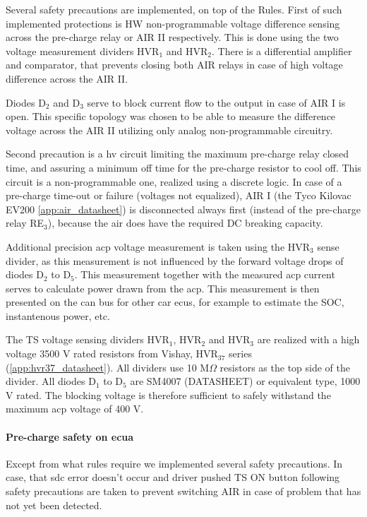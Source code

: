 Several safety precautions are implemented, on top of the Rules. First of such implemented protections is HW non-programmable voltage difference sensing across the pre-charge relay or AIR II respectively. This is done using the two voltage measurement dividers HVR$_1$ and HVR$_2$. There is a differential amplifier and comparator, that prevents closing both AIR relays in case of high voltage difference across the AIR II. 

Diodes D$_2$ and D$_3$ serve to block current flow to the output in case of AIR I is open. This specific topology was chosen to be able to measure the difference voltage across the AIR II utilizing only analog non-programmable circuitry.

Second precaution is a \gls{hv} circuit limiting the maximum pre-charge relay closed time, and assuring a minimum off time for the pre-charge resistor to cool off. This circuit is a non-programmable one, realized using a discrete logic. In case of a pre-charge time-out or failure (voltages not equalized), AIR I (the Tyco Kilovac EV200 \ref{app:air_datasheet}) is disconnected always first (instead of the pre-charge relay RE$_3$), because the \gls{air} does have the required DC breaking capacity.

Additional precision \gls{acp} voltage measurement is taken using the HVR$_3$ sense divider, as this measurement is not influenced by the forward voltage drops of diodes D$_2$ to D$_5$. This measurement together with the measured \gls{acp} current serves to calculate power drawn from the \gls{acp}. This measurement is then presented on the \gls{can} bus for other car \glspl{ecu}, for example to estimate the SOC, instantenous power, etc.  

The TS voltage sensing dividers HVR$_1$, HVR$_2$ and HVR$_3$ are realized with a high voltage 3500 V rated resistors from Vishay, HVR$_{37}$ series (\ref{app:hvr37_datasheet}). All dividers use 10 M$\Omega$ resistors as the top side of the divider. All diodes D$_1$ to D$_5$ are SM4007 (DATASHEET) or equivalent type, 1000 V rated. The blocking voltage is therefore sufficient to safely withstand the maximum \gls{acp} voltage of 400 V.

\paragraph{Pre-charge safety on \gls{ecua}}
Except from what rules require we implemented several safety precautions. In case, that \gls{sdc} error doesn’t occur and driver pushed TS ON button following safety precautions are taken to prevent switching AIR in case of problem that has not yet been detected.


